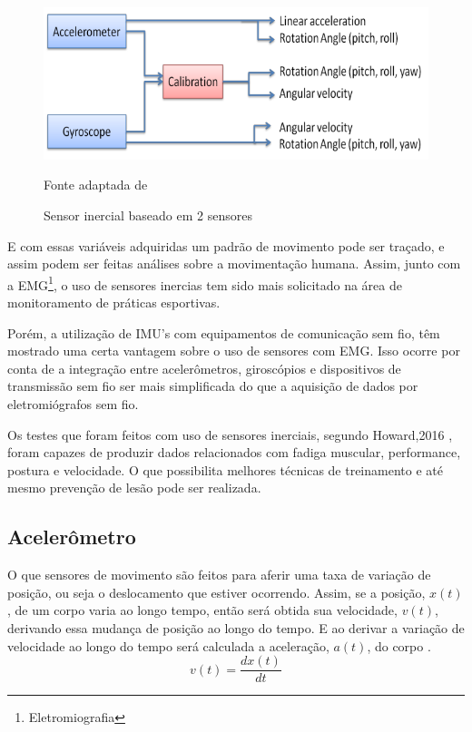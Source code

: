 \begin{figure}[h]
	\centering
	\includegraphics[keepaspectratio=true,scale=0.3
	]{figuras/integracao_imu.png}
	\caption{Sensor inercial baseado em 2 sensores}
	Fonte adaptada de \cite{ahmad2013}
	\label{integracao_imu}
	
\end{figure}

E com essas variáveis adquiridas um padrão de movimento pode ser traçado, e assim podem ser feitas análises sobre a movimentação humana. Assim, junto com a EMG\footnote{Eletromiografia}, o uso de sensores inercias tem sido mais solicitado na área de monitoramento de práticas esportivas\cite{howard2016}.

Porém, a utilização de IMU's com equipamentos de comunicação sem fio, têm mostrado uma certa vantagem sobre o uso de sensores com EMG. Isso ocorre por conta de a integração entre acelerômetros, giroscópios e dispositivos de transmissão sem fio ser mais simplificada do que a aquisição de dados por eletromiógrafos sem fio\cite{howard2016}. 

Os testes que foram feitos com uso de sensores inerciais, segundo  Howard,2016 , foram capazes de produzir dados relacionados com fadiga muscular, performance, postura e velocidade. O que possibilita melhores técnicas de treinamento e até mesmo prevenção de lesão pode ser realizada.

\subsection{Acelerômetro}

O que sensores de movimento são feitos para aferir uma taxa de variação de posição, ou seja o deslocamento que estiver ocorrendo. Assim, se a posição, $x(t)$, de um corpo varia ao longo tempo, então será obtida sua velocidade, $v(t)$,  derivando essa mudança de posição ao longo do tempo. E ao derivar a variação de velocidade ao longo do tempo será calculada a aceleração, $a(t)$, do corpo \cite{moyses2013}.
\begin{equation}
v(t) = \frac{dx(t)}{dt}
\end{equation}

